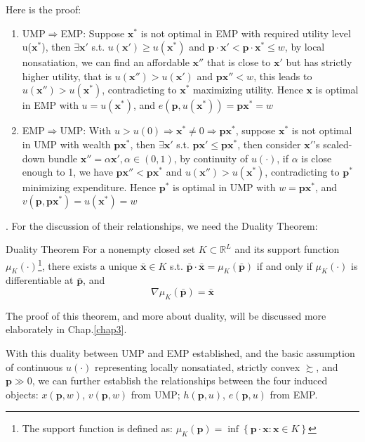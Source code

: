 Here is the proof:
\begin{enumerate}
    \item UMP$\Rightarrow$EMP: Suppose $\mathbf{x}^*$ is not optimal in EMP with required utility level u($\mathbf{x}^*$), then $\exists \mathbf{x}'$ s.t. $u(\mathbf{x}')\geq u(\mathbf{x}^*)$ and $\mathbf{p}\cdot\mathbf{x}'<\mathbf{p}\cdot\mathbf{x}^*\leq w$, by local nonsatiation, we can find an affordable $\mathbf{x}''$ that is close to $\mathbf{x}'$ but has strictly higher utility, that is $u(\mathbf{x}'')>u(\mathbf{x}')$ and $\mathbf{p}\mathbf{x}''< w$, this leads to $u(\mathbf{x}'')>u(\mathbf{x}^*)$, contradicting to $\mathbf{x}^*$ maximizing utility. Hence $\mathbf{x}$ is optimal in EMP with $u=u(\mathbf{x}^*)$, and $e(\mathbf{p},u(\mathbf{x}^*))=\mathbf{p}\mathbf{x}^*=w$
    \item EMP$\Rightarrow$UMP: With $u>u(0)\Rightarrow \mathbf{x}^*\neq 0\Rightarrow \mathbf{p}\mathbf{x}^*$, suppose $\mathbf{x}^*$ is not optimal in UMP with wealth $\mathbf{p}\mathbf{x}^*$, then $\exists \mathbf{x}'$ s.t. $\mathbf{p}\mathbf{x}'\leq \mathbf{p}\mathbf{x}^*$, then consider $\mathbf{x}'$'s scaled-down bundle $\mathbf{x}''=\alpha \mathbf{x}',\alpha\in(0,1)$, by continuity of $u(\cdot)$, if $\alpha$ is close enough to 1, we have $\mathbf{p}\mathbf{x}''<\mathbf{p}\mathbf{x}^*$ and $u(\mathbf{x}'')>u(\mathbf{x}^*)$, contradicting to $\mathbf{p}^*$ minimizing expenditure. Hence $\mathbf{p}^*$ is optimal in UMP with $w=\mathbf{p}\mathbf{x}^*$, and $v(\mathbf{p},\mathbf{p}\mathbf{x}^*)=u(\mathbf{x}^*)=w$
\end{enumerate}

. For the discussion of their relationships, we need the Duality Theorem:
\begin{theorem*}{Duality Theorem}{}
    For a nonempty closed set $K\subset\mathbb{R}^L$ and its support function $\mu_{K}(\cdot)$\footnote{The support function is defined as: $\mu_K(\mathbf{p})=\inf\left\{\mathbf{p}\cdot\mathbf{x}:\mathbf{x}\in K\right\}$}, there exists a unique $\bar{\mathbf{x}}\in K$ s.t. $\bar{\mathbf{p}}\cdot\bar{\mathbf{x}}=\mu_K(\bar{\mathbf{p}})$ if and only if $\mu_K(\cdot)$ is differentiable at $\bar{\mathbf{p}}$, and $$ \nabla\mu_K(\bar{\mathbf{p}})=\bar{\mathbf{x}} $$
\end{theorem*}

The proof of this theorem, and more about duality, will be discussed more elaborately in Chap.\ref{chap3}.

With this duality between UMP and EMP established, and the basic assumption of continuous $u(\cdot)$ representing locally nonsatiated, strictly convex $\succsim$, and $\mathbf{p}\gg 0$, we can further establish the relationships between the four induced objects:  $x(\mathbf{p},w)$, $v(\mathbf{p},w)$ from UMP; $h(\mathbf{p},u)$, $e(\mathbf{p},u)$ from EMP.


